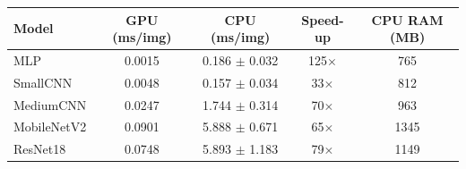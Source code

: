 \begin{tabular}{lcccc}
\toprule
Model & GPU (ms/img) & CPU (ms/img) & Speed-up & CPU RAM (MB) \\
\midrule
MLP & 0.0015 & 0.186 $\pm$ 0.032 & 125$\times$ & 765 \\
SmallCNN & 0.0048 & 0.157 $\pm$ 0.034 & 33$\times$ & 812 \\
MediumCNN & 0.0247 & 1.744 $\pm$ 0.314 & 70$\times$ & 963 \\
MobileNetV2 & 0.0901 & 5.888 $\pm$ 0.671 & 65$\times$ & 1345 \\
ResNet18 & 0.0748 & 5.893 $\pm$ 1.183 & 79$\times$ & 1149 \\
\bottomrule
\end{tabular}
